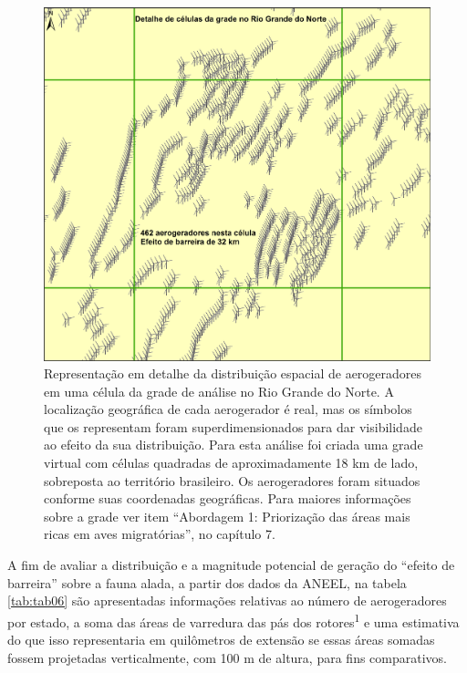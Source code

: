 \documentclass[
  oneside]{scrbook}
\begin{document}
\begin{figure}[H]

{\centering \includegraphics[width=0.75\linewidth]{imagens/cap07/Figura_7.42} 

}

\caption{Representação em detalhe da distribuição espacial de aerogeradores em uma célula da grade de análise no Rio Grande do Norte. A localização geográfica de cada aerogerador é real, mas os símbolos que os representam foram superdimensionados para dar visibilidade ao efeito da sua distribuição. Para esta análise foi criada uma grade virtual com células quadradas de aproximadamente 18 km de lado, sobreposta ao território brasileiro. Os aerogeradores foram situados conforme suas coordenadas geográficas. Para maiores informações sobre a grade ver item “Abordagem 1: Priorização das áreas mais ricas em aves migratórias”, no capítulo 7.}\label{fig:61b}
\end{figure}

\begin{blackbox}
A fim de avaliar a distribuição e a magnitude potencial de geração do ``efeito de barreira'' sobre a fauna alada, a partir dos dados da ANEEL, na tabela \ref{tab:tab06} são apresentadas informações relativas ao número de aerogeradores por estado, a soma das áreas de varredura das pás dos rotores\textsuperscript{1} e uma estimativa do que isso representaria em quilômetros de extensão se essas áreas somadas fossem projetadas verticalmente, com 100 m de altura, para fins comparativos.

\end{blackbox}
\end{document}
